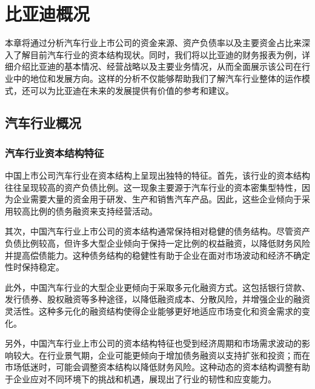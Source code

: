 \chapter{比亚迪概况}
本章将通过分析汽车行业上市公司的资金来源、资产负债率以及主要资金占比来深入了解目前汽车行业的资本结构现状。同时，我们将以比亚迪的财务报表为例，详细介绍比亚迪的基本情况、经营战略以及主要业务情况，从而全面展示该公司在行业中的地位和发展方向。这样的分析不仅能够帮助我们了解汽车行业整体的运作模式，还可以为比亚迪在未来的发展提供有价值的参考和建议。
\section{汽车行业概况}
\subsection{汽车行业资本结构特征}
中国上市公司汽车行业在资本结构上呈现出独特的特征。首先，该行业的资本结构往往呈现较高的资产负债比例。这一现象主要源于汽车行业的资本密集型特性，因为企业需要大量的资金用于研发、生产和销售汽车产品。因此，这些企业倾向于采用较高比例的债务融资来支持经营活动。

其次，中国汽车行业上市公司的资本结构通常保持相对稳健的债务结构。尽管资产负债比例较高，但许多大型企业倾向于保持一定比例的权益融资，以降低财务风险并提高偿债能力。这种债务结构的稳健性有助于企业在面对市场波动和经济不确定性时保持稳定。

此外，中国汽车行业的大型企业更倾向于采取多元化融资方式。这包括银行贷款、发行债券、股权融资等多种途径，以降低融资成本、分散风险，并增强企业的融资灵活性。这种多元化的融资结构使得企业能够更好地适应市场变化和资金需求的变化。

另外，中国汽车行业上市公司的资本结构特征也受到经济周期和市场需求波动的影响较大。在行业景气期，企业可能更倾向于增加债务融资以支持扩张和投资；而在市场低迷时，可能会调整资本结构以降低财务风险。这种动态的资本结构调整有助于企业应对不同环境下的挑战和机遇，展现出了行业的韧性和应变能力。

